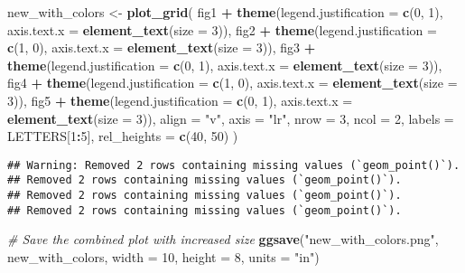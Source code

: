 \documentclass[
]{article}
\newenvironment{Shaded}{\begin{snugshade}}{\end{snugshade}}
\newcommand{\AttributeTok}[1]{\textcolor[rgb]{0.13,0.29,0.53}{#1}}
\newcommand{\CommentTok}[1]{\textcolor[rgb]{0.56,0.35,0.01}{\textit{#1}}}
\newcommand{\DecValTok}[1]{\textcolor[rgb]{0.00,0.00,0.81}{#1}}
\newcommand{\FunctionTok}[1]{\textcolor[rgb]{0.13,0.29,0.53}{\textbf{#1}}}
\newcommand{\NormalTok}[1]{#1}
\newcommand{\OtherTok}[1]{\textcolor[rgb]{0.56,0.35,0.01}{#1}}
\newcommand{\SpecialCharTok}[1]{\textcolor[rgb]{0.81,0.36,0.00}{\textbf{#1}}}
\newcommand{\StringTok}[1]{\textcolor[rgb]{0.31,0.60,0.02}{#1}}
\begin{document}
\begin{Shaded}
\begin{Highlighting}[]
\NormalTok{new\_with\_colors }\OtherTok{\textless{}{-}} 
  \FunctionTok{plot\_grid}\NormalTok{(}
\NormalTok{  fig1 }\SpecialCharTok{+} \FunctionTok{theme}\NormalTok{(}\AttributeTok{legend.justification =} \FunctionTok{c}\NormalTok{(}\DecValTok{0}\NormalTok{, }\DecValTok{1}\NormalTok{), }\AttributeTok{axis.text.x =} \FunctionTok{element\_text}\NormalTok{(}\AttributeTok{size =} \DecValTok{3}\NormalTok{)),}
\NormalTok{  fig2 }\SpecialCharTok{+} \FunctionTok{theme}\NormalTok{(}\AttributeTok{legend.justification =} \FunctionTok{c}\NormalTok{(}\DecValTok{1}\NormalTok{, }\DecValTok{0}\NormalTok{), }\AttributeTok{axis.text.x =} \FunctionTok{element\_text}\NormalTok{(}\AttributeTok{size =} \DecValTok{3}\NormalTok{)),}
\NormalTok{  fig3 }\SpecialCharTok{+} \FunctionTok{theme}\NormalTok{(}\AttributeTok{legend.justification =} \FunctionTok{c}\NormalTok{(}\DecValTok{0}\NormalTok{, }\DecValTok{1}\NormalTok{), }\AttributeTok{axis.text.x =} \FunctionTok{element\_text}\NormalTok{(}\AttributeTok{size =} \DecValTok{3}\NormalTok{)),}
\NormalTok{  fig4 }\SpecialCharTok{+} \FunctionTok{theme}\NormalTok{(}\AttributeTok{legend.justification =} \FunctionTok{c}\NormalTok{(}\DecValTok{1}\NormalTok{, }\DecValTok{0}\NormalTok{), }\AttributeTok{axis.text.x =} \FunctionTok{element\_text}\NormalTok{(}\AttributeTok{size =} \DecValTok{3}\NormalTok{)),}
\NormalTok{  fig5 }\SpecialCharTok{+} \FunctionTok{theme}\NormalTok{(}\AttributeTok{legend.justification =} \FunctionTok{c}\NormalTok{(}\DecValTok{0}\NormalTok{, }\DecValTok{1}\NormalTok{), }\AttributeTok{axis.text.x =} \FunctionTok{element\_text}\NormalTok{(}\AttributeTok{size =} \DecValTok{3}\NormalTok{)),}
  \AttributeTok{align =} \StringTok{"v"}\NormalTok{, }\AttributeTok{axis =} \StringTok{"lr"}\NormalTok{, }\AttributeTok{nrow =} \DecValTok{3}\NormalTok{, }\AttributeTok{ncol =} \DecValTok{2}\NormalTok{, }\AttributeTok{labels =}\NormalTok{ LETTERS[}\DecValTok{1}\SpecialCharTok{:}\DecValTok{5}\NormalTok{], }\AttributeTok{rel\_heights =} \FunctionTok{c}\NormalTok{(}\DecValTok{40}\NormalTok{, }\DecValTok{50}\NormalTok{)}
\NormalTok{)}
\end{Highlighting}
\end{Shaded}

\begin{verbatim}
## Warning: Removed 2 rows containing missing values (`geom_point()`).
## Removed 2 rows containing missing values (`geom_point()`).
## Removed 2 rows containing missing values (`geom_point()`).
## Removed 2 rows containing missing values (`geom_point()`).
\end{verbatim}

\begin{Shaded}
\begin{Highlighting}[]
\CommentTok{\# Save the combined plot with increased size}
\FunctionTok{ggsave}\NormalTok{(}\StringTok{"new\_with\_colors.png"}\NormalTok{, new\_with\_colors, }\AttributeTok{width =} \DecValTok{10}\NormalTok{, }\AttributeTok{height =} \DecValTok{8}\NormalTok{, }\AttributeTok{units =} \StringTok{"in"}\NormalTok{)}
\end{Highlighting}
\end{Shaded}
\end{document}
